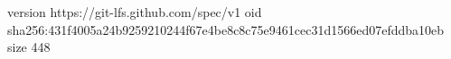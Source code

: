 version https://git-lfs.github.com/spec/v1
oid sha256:431f4005a24b9259210244f67e4be8c8c75e9461cec31d1566ed07efddba10eb
size 448

